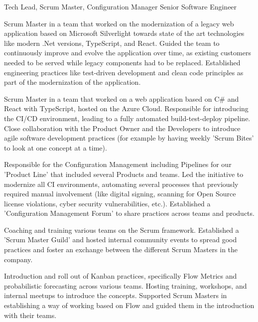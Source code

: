\begin{cventries}
	\cventry
	{
		{		}
		{Tech Lead, Scrum Master, Configuration Manager}
	} %
	{
		{Senior Software Engineer}
	} %
	{
	} %
	{
	} %
	{
		\begin{cvitems}
			\item {
				{Scrum Master in a team that worked on the modernization of a legacy web application based on Microsoft Silverlight towards state of the art technologies like modern .Net versions, TypeScript, and React. Guided the team to continuously improve and evolve the application over time, as existing customers needed to be served while legacy components had to be replaced. Established engineering practices like test-driven development and clean code principles as part of the modernization of the application. }
			}
			\item {
				{Scrum Master in a team that worked on a web application based on C\# and React with TypeScript, hosted on the Azure Cloud. Responsible for introducing the CI/CD environment, leading to a fully automated build-test-deploy pipeline. Close collaboration with the Product Owner and the Developers to introduce agile software development practices (for example by having weekly 'Scrum Bites' to look at one concept at a time). }
			}			
			\item {
				{Responsible for the Configuration Management including Pipelines for our 'Product Line' that included several Products and teams. Led the initiative to modernize all CI environments, automating several processes that previously required manual involvement (like digital signing, scanning for Open Source license violations, cyber security vulnerabilities, etc.). Established a 'Configuration Management Forum' to share practices across teams and products.	}
			}
			\item {
				{Coaching and training various teams on the Scrum framework. Established a 'Scrum Master Guild' and hosted internal community events to spread good practices and foster an exchange between the different Scrum Masters in the company.}
			}	
			\item {
				{Introduction and roll out of Kanban practices, specifically Flow Metrics and probabilistic forecasting across various teams. Hosting training, workshops, and internal meetups to introduce the concepts. Supported Scrum Masters in establishing a way of working based on Flow and guided them in the introduction with their teams.}
			}	
		\end{cvitems}
	}
	

\end{cventries}
